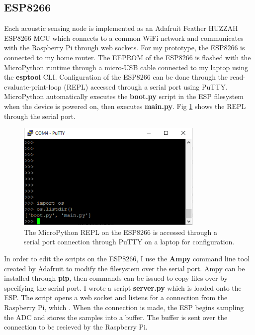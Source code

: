 \documentclass[12pt]{article}
\begin{document}
\subsection{ESP8266}
	Each acoustic sensing node is implemented as an Adafruit Feather HUZZAH ESP8266 MCU which connects to a common WiFi network and communicates with the Raspberry Pi through web sockets. For my prototype, the ESP8266 is connected to my home router. 
	The EEPROM of the ESP8266 is flashed with the MicroPython runtime through a micro-USB cable connected to my laptop using the \textbf{esptool} CLI. Configuration of the ESP8266 can be done through the read-evaluate-print-loop (REPL) accessed through a serial port using PuTTY. MicroPython automatically executes the \textbf{boot.py} script in the ESP filesystem when the device is powered on, then executes \textbf{main.py}. Fig \ref{fig:PuTTY_REPL} shows the REPL through the serial port.
	
\begin{figure}[h]
\centering
\includegraphics[width=0.8\textwidth]{PuTTY_REPL.png} %
\caption{The MicroPython REPL on the ESP8266 is accessed through a serial port connection through PuTTY on a laptop for configuration.}
\label{fig:PuTTY_REPL}
\end{figure}
	
	In order to edit the scripts on the ESP8266, I use the \textbf{Ampy} command line tool created by Adafruit to modify the filesystem over the serial port. Ampy can be installed through \textbf{pip}, then commands can be issued to copy files over by specifying the serial port.
	I wrote a script \textbf{server.py} which is loaded onto the ESP. The script opens a web socket and listens for a connection from the Raspberry Pi, which . When the connection is made, the ESP begins sampling the ADC and stores the samples into a buffer. The buffer is sent over the connection to be recieved by the Raspberry Pi.
\end{document}
